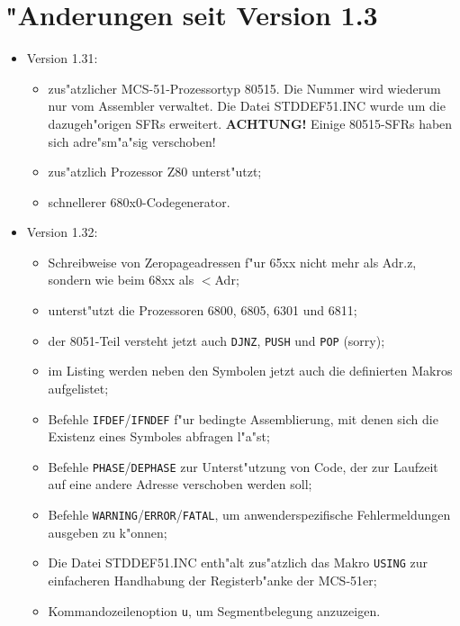 \documentclass[12pt,a4paper,twoside]{report}
\newcommand{\bb}[1]{{\bf #1}}
\newcommand{\tty}[1]{{\tt #1}}
\begin{document}

\cleardoublepage
\chapter{"Anderungen seit Version 1.3}

\begin{itemize}
\item{Version 1.31:
      \begin{itemize}
      \item{zus"atzlicher MCS-51-Prozessortyp 80515.  Die Nummer wird
            wiederum nur vom Assembler verwaltet.  Die Datei STDDEF51.INC
            wurde um die dazugeh"origen SFRs erweitert. \bb{ACHTUNG!}
            Einige 80515-SFRs haben sich adre"sm"a"sig verschoben!}
      \item{zus"atzlich Prozessor Z80 unterst"utzt;}
      \item{schnellerer 680x0-Codegenerator.}
      \end{itemize}}
\item{Version 1.32:
      \begin{itemize}
      \item{Schreibweise von Zeropageadressen f"ur 65xx nicht mehr als
            Adr.z, sondern wie beim 68xx als $<$Adr;}
      \item{unterst"utzt die Prozessoren 6800, 6805, 6301 und 6811;}
      \item{der 8051-Teil versteht jetzt auch \tty{DJNZ}, \tty{PUSH} und
            \tty{POP} (sorry);}
      \item{im Listing werden neben den Symbolen jetzt auch die definierten
            Makros aufgelistet;}
      \item{Befehle \tty{IFDEF}/\tty{IFNDEF} f"ur bedingte Assemblierung,
            mit denen sich die Existenz eines Symboles abfragen l"a"st;}
      \item{Befehle \tty{PHASE}/\tty{DEPHASE} zur Unterst"utzung von Code, der zur
            Laufzeit auf eine andere Adresse verschoben werden soll;}
      \item{Befehle \tty{WARNING}/\tty{ERROR}/\tty{FATAL}, um anwenderspezifische
            Fehlermeldungen ausgeben zu k"onnen;}
      \item{Die Datei STDDEF51.INC enth"alt zus"atzlich das Makro \tty{USING}
            zur einfacheren Handhabung der Registerb"anke der MCS-51er;}
      \item{Kommandozeilenoption \tty{u}, um Segmentbelegung anzuzeigen.}

\end{itemize}}
\end{itemize}
\end{document}
